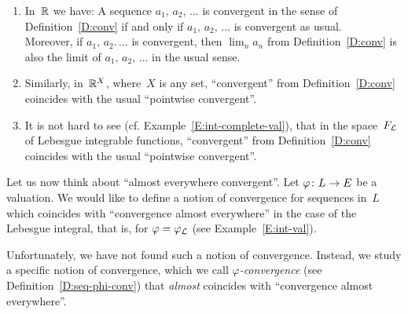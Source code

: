 \documentclass[main.tex]{subfiles}
\begin{document}
%
\begin{exs}
\label{E:conv}
\begin{enumerate}
\item 
In~$\mathbb{R}$ we have:
A sequence $a_1,\,a_2,\,\dotsc$
is convergent in the sense of Definition~\ref{D:conv}
if and only if $a_1,\,a_2,\,\dotsc$
is convergent as usual.\\
Moreover, if $a_1,\,a_2.\,\dotsc$
is convergent, then $\lim_n a_n$ from Definition~\ref{D:conv}
is also the limit of $a_1,\,a_2,\,\dotsc$
in the usual sense.

\item
Similarly,
in~$\mathbb{R}^X$, where~$X$ is any set,
``convergent'' from Definition~\ref{D:conv}
coincides with the usual ``pointwise convergent''.

\item
It is not hard to see
(cf. Example~\ref{E:int-complete-val}),
that in the space~$F_{\mathcal{L}}$ of Lebesgue integrable functions,
``convergent'' from Definition~\ref{D:conv}
coincides with the usual ``pointwise convergent''.
\end{enumerate}
\end{exs}

%
%
Let us now think about ``almost everywhere convergent''.
Let $\varphi\colon L \rightarrow E$ be a valuation.
We would like to define a notion of convergence
for sequences in~$L$ 
which coincides with ``convergence
almost everywhere'' in the case of the  Lebesgue integral,
that is, for $\varphi = \varphi_{\mathcal{L}}$
(see Example~\ref{E:int-val}).

Unfortunately,
we have not found such a notion of convergence.
Instead,
we study a specific notion of convergence,
which we call \emph{$\varphi$-convergence}
(see Definition~\ref{D:seq-phi-conv})
that \emph{almost} coincides with ``convergence almost everywhere''.
\end{document}
